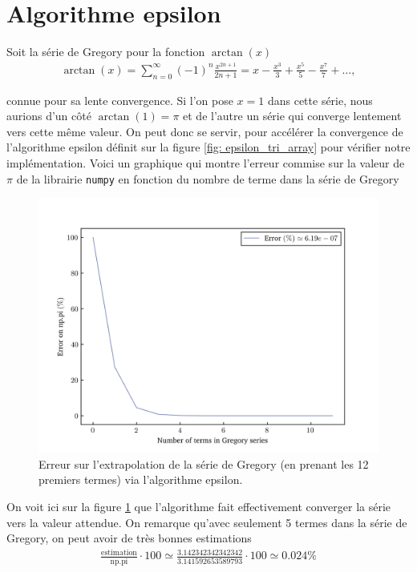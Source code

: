 \section{Algorithme epsilon} \label{sec: annexe_epsilon}
    Soit la série de Gregory pour la fonction $\arctan(x)$
    \begin{align*}
        \arctan(x) = \sum_{n = 0}^\infty(-1)^n\frac{x^{2n + 1}}{2n + 1}
        = x - \frac{x^3}{3} + \frac{x^5}{5} - \frac{x^7}{7} + \dots,
        \label{eq: gregory}
    \end{align*}

    connue pour sa lente convergence. Si l'on pose $x = 1$ dans cette série,
    nous aurions d'un côté $\arctan(1) = \pi$ et de l'autre un série qui
    converge lentement vers cette même valeur. On peut donc se servir, pour
    accélérer la convergence de l'algorithme epsilon définit sur la figure
    \ref{fig: epsilon_tri_array} pour vérifier notre implémentation. Voici un
    graphique qui montre l'erreur commise sur la valeur de $\pi$ de la
    librairie \texttt{numpy} en fonction du nombre de terme dans la série de
    Gregory
    \begin{figure}[h!]
        \centering
        \includegraphics[scale=0.4]{figs/error_percentage.png}
        \caption{Erreur sur l'extrapolation de la série de Gregory (en prenant
        les 12 premiers termes) via l'algorithme epsilon.}
        \label{fig: epsilon_error}
    \end{figure}
    On voit ici sur la figure \ref{fig: epsilon_error} que l'algorithme fait
    effectivement converger la série vers la valeur attendue. On remarque
    qu'avec seulement 5 termes dans la série de Gregory, on peut avoir de très
    bonnes estimations
    \begin{align*}
        \frac{\text{estimation}}{\text{np.pi}}\cdot 100 \simeq
        \frac{3.142342342342342}{3.141592653589793}\cdot 100 \simeq  0.024\%
    \end{align*}
